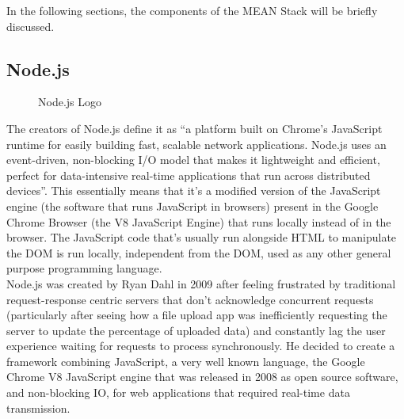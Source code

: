 In the following sections, the components of the MEAN Stack will be briefly discussed.\\
\newpage
\subsection{Node.js} \label{nodejs}
\begin{figure}[H]
\centering

\caption{Node.js Logo}
\end{figure}
The creators of Node.js define it as ``a platform built on Chrome's JavaScript runtime for easily building fast, scalable
network applications. Node.js uses an event-driven, non-blocking I/O model that makes it lightweight and efficient, perfect
for data-intensive real-time applications that run across distributed devices''\cite{nodejs15}. This essentially means that
it's a modified version of the JavaScript engine (the software that runs JavaScript in browsers) present in the Google Chrome
Browser (the V8 JavaScript Engine) that runs locally instead of in the browser. The JavaScript code that's usually run
alongside HTML to manipulate the DOM is run locally, independent from the DOM, used as any other general purpose programming
language.\\

Node.js was created by Ryan Dahl in 2009 after feeling frustrated by traditional request-response centric servers that don't
acknowledge concurrent requests (particularly after seeing how a file upload app was inefficiently requesting the server to
update the percentage of uploaded data\cite{nodesummit12}) and constantly lag the user experience waiting for requests to
process synchronously. He decided to create a framework combining JavaScript, a very well known language, the Google Chrome V8
JavaScript engine that was released in 2008 as open source software, and non-blocking IO, for web applications that required
real-time data transmission.

